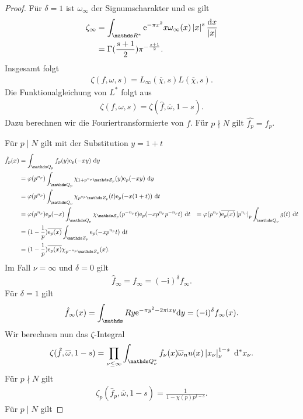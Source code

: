 \begin{proof}
Für $\delta=1$ ist $\omega_\infty$ der Signumscharakter und es gilt
\begin{align*}
\zeta_\infty &=\int_{\R^\ast} \mathrm{e}^{-\pi x^2}  x \omega_\infty(x)\abs{x}^s\frac{\mathrm{d}x}{\abs{x}}\\
&=\Gamma(\frac{s+1}{2})\pi^{-\frac{s+1}{2}}.
\end{align*}
Insgesamt folgt
\begin{align*}
\zeta(f,\omega,s)=L_\infty(\overline{\chi},s) L(\overline{\chi},s).
\end{align*}
Die Funktionalgleichung von $L^\ast$ folgt aus
\begin{align*}
\zeta(f,\omega,s)=\zeta(\hat{f},\overline{\omega},1-s).
\end{align*}
Dazu berechnen wir die Fouriertransformierte von $f$.
Für $p \nmid N$ gilt $\hat{f_p}=f_p$.

Für $p \mid N$ gilt mit der Substitution $y=1+t$
\begin{align*}
\hat{f_p}(x)&=\int_{\Q_p} f_p(y)\ex_p(-xy)~\mathrm{d}y\\
&=\varphi(p^{n_p})\int_{\Q_p} \chi_{1+p^{n_p}\Z_p}(y)\ex_p(-xy)~\mathrm{d}y\\
&= \varphi(p^{n_p})\int_{\Q_p} \chi_{p^{n_p} \Z_p}(t)\ex_p(-x(1+t))~\mathrm{d}t\\
&=\varphi(p^{n_p})\ex_p(-x)\int_{\Q_p} \chi_{\Z_p}(p^{-n_p}t)\ex_p(-xp^{n_p}p^{-n_p}t)~\mathrm{d}t
&=\varphi(p^{n_p})\overline{\ex_p(x)} \abs{p^{n_p}}_p \int_{\Q_p} g(t)~\mathrm{d}t\\
&=(1-\frac{1}{p})\overline{\ex_p(x)} \int_{\Z_p} \ex_p(-xp^{n_p}t)~\mathrm{d}t\\
&=(1-\frac{1}{p})\overline{\ex_p(x)} \chi_{p^{-n_p}\Z_p}(x).
\end{align*}
Im Fall $\nu=\infty$ und $\delta=0$ gilt
\begin{align*}
\hat{f}_\infty=f_\infty=(-\mathrm{i})^\delta f_{\infty}.
\end{align*}
Für $\delta=1$ gilt
\begin{align*}
\hat{f}_{\infty}(x)=\int_\R y \ex^{-\pi y^2-2\pi \mathrm{i}xy}\mathrm{d}y=(-\mathrm{i})^\delta f_\infty(x).
\end{align*}
Wir berechnen nun das $\zeta$-Integral
\begin{align*}
\zeta(\hat{f},\overline{\omega},1-s)=\prod_{\nu \leq \infty} \int_{\Q_\nu^\ast} f_\nu(x)\overline{\omega}_nu(x)\abs{x_\nu}_\nu^{1-s}~\mathrm{d}^\ast x_\nu.
\end{align*}
Für $p \nmid N$ gilt
\begin{align*}
\zeta_p(\hat{f}_p,\overline{\omega},1-s)=\frac{1}{1-\chi(p)p^{1-s}}.
\end{align*}
Für $p\mid N$ gilt
\end{proof}